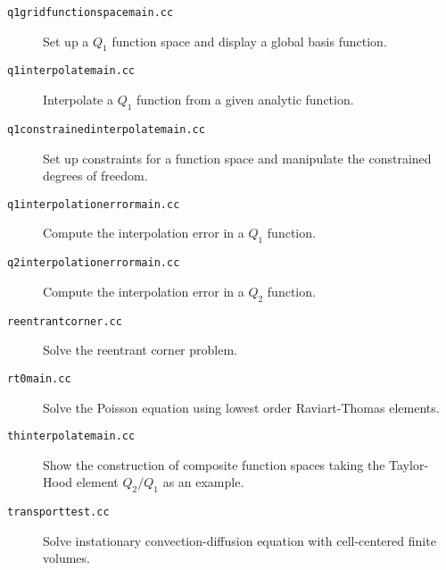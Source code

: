 {\begin{description}
\item[\texttt{q1gridfunctionspacemain.cc}] 
Set up a $Q_1$ function space and display a global basis function.

\item[\texttt{q1interpolatemain.cc}] 
Interpolate a $Q_1$ function from a given analytic function.

\item[\texttt{q1constrainedinterpolatemain.cc}]
Set up constraints for a function space and manipulate the constrained
degrees of freedom.

\item[\texttt{q1interpolationerrormain.cc}]
Compute the interpolation error in a $Q_1$ function.

\item[\texttt{q2interpolationerrormain.cc}]
Compute the interpolation error in a $Q_2$ function. 

\item[\texttt{reentrantcorner.cc}]
Solve the reentrant corner problem.

\item[\texttt{rt0main.cc}]
Solve the Poisson equation using lowest order Raviart-Thomas elements.

\item[\texttt{thinterpolatemain.cc}]
Show the construction of composite function spaces taking the
Taylor-Hood element $Q_2/Q_1$ as an example.

\item[\texttt{transporttest.cc}] Solve instationary convection-diffusion equation with 
cell-centered finite volumes.
\end{description}

\cleardoublepage
}
